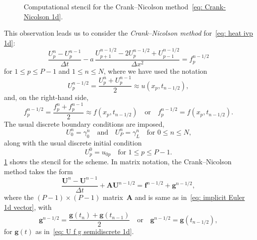\begin{figure}
\caption{Computational stencil for the Crank--Nicolson 
method~\eqref{eq: Crank-Nicolson 1d}.}\label{fig: Crank-Nicolson 1d}
\begin{center}
\end{center}
\end{figure}

This observation leads us to consider the \emph{Crank--Nicolson method} 
for~\eqref{eq: heat ivp 1d}:
\begin{equation}\label{eq: Crank-Nicolson 1d}
\frac{U^n_p-U^{n-1}_p}{\Delta t}
    -a\,\frac{U^{n-1/2}_{p+1}-2U^{n-1/2}_p+U^{n-1/2}_{p-1}}{\Delta x^2}
    =f^{n-1/2}_p
\end{equation}
for $1\le p\le P-1$ and $1\le n\le N$, where we have used the notation
\[
U^{n-1/2}_p=\frac{U^n_p+U^{n-1}_p}{2}\approx u(x_p,t_{n-1/2}),
\]
and, on the right-hand side, 
\[
f^{n-1/2}_p=\frac{f^n_p+f^{n-1}_p}{2}\approx f(x_p,t_{n-1/2})
\quad\text{or}\quad
f^{n-1/2}_p=f(x_p,t_{n-1/2}).
\]
The usual discrete boundary conditions are imposed,
\[
U^n_0=\gamma_0^n\quad\text{and}\quad
U^n_P=\gamma_L^n\quad\text{for $0\le n\le N$,}
\]
along with the usual discrete initial condition
\[
U^0_p=u_{0p}\quad\text{for $1\le p\le P-1$.}
\]
\cref{fig: Crank-Nicolson 1d} shows the stencil for the scheme.
In matrix notation, the Crank--Nicolson method takes the form
\begin{equation}\label{eq: Crank-Nicolson matrix}
\frac{\boldsymbol{U}^n-\boldsymbol{U}^{n-1}}{\Delta t}
    +\boldsymbol{A}\boldsymbol{U}^{n-1/2}=\boldsymbol{f}^{n-1/2}
    +\boldsymbol{g}^{n-1/2},
\end{equation}
where the $(P-1)\times(P-1)$ matrix~$\boldsymbol{A}$ and 
is same as in~\eqref{eq: implicit Euler 1d vector}, with 
\[
\boldsymbol{g}^{n-1/2}=\frac{\boldsymbol{g}(t_n)+\boldsymbol{g}(t_{n-1})}{2}
\quad\text{or}\quad
\boldsymbol{g}^{n-1/2}=\boldsymbol{g}(t_{n-1/2}),
\]
for $\boldsymbol{g}(t)$ as in~\eqref{eq: U f g semidiscrete 1d}.

